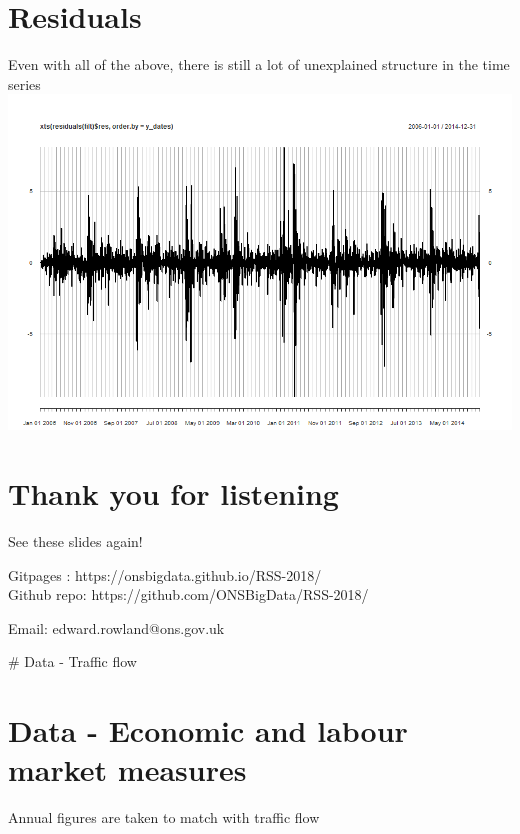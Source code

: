 \documentclass[11pt]{article}
\makeatletter
\def\maxwidth{\ifdim\Gin@nat@width>\linewidth\linewidth
    \else\Gin@nat@width\fi}
\let\Oldincludegraphics\includegraphics
\renewcommand{\includegraphics}[1]{\Oldincludegraphics[width=.8\maxwidth]{#1}}
\makeatother
\begin{document}
    \section{Residuals}\label{residuals}

Even with all of the above, there is still a lot of unexplained
structure in the time series \includegraphics{images/resid 2.png}

    \section{Thank you for listening}\label{thank-you-for-listening}

See these slides again!

Gitpages : https://onsbigdata.github.io/RSS-2018/\\
Github repo: https://github.com/ONSBigData/RSS-2018/

Email: edward.rowland@ons.gov.uk

    \# Data - Traffic flow

    \section{Data - Economic and labour market
measures}\label{data---economic-and-labour-market-measures}

    Annual figures are taken to match with traffic flow
\end{document}
